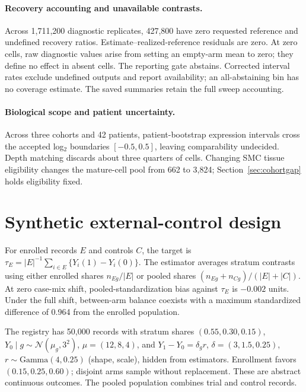 \paragraph{Recovery accounting and unavailable contrasts.}\label{app:generator}
Across 1{,}711{,}200 diagnostic replicates, 427{,}800 have zero requested
reference and undefined recovery ratios. Estimate--realized-reference
residuals are zero. At zero cells, raw diagnostic values arise from setting
an empty-arm mean to zero; they define no effect in absent cells. The
reporting gate abstains. Corrected interval rates exclude undefined outputs
and report availability; an all-abstaining bin has no coverage estimate.
The saved summaries retain the full sweep accounting.

\paragraph{Biological scope and patient uncertainty.}\label{app:guards}
\label{app:modal}\label{app:limitations}
Across three cohorts and 42 patients, patient-bootstrap expression intervals
cross the accepted log$_2$ boundaries $[-0.5,0.5]$, leaving comparability
undecided. Depth matching discards about three quarters of cells. Changing
SMC tissue eligibility changes the mature-cell pool from 662 to 3{,}824;
Section~\ref{sec:cohortgap} holds eligibility fixed.



\section{Synthetic external-control design}
\label{app:eca}

For enrolled records $E$ and controls $C$, the target is
$\tau_E=|E|^{-1}\sum_{i\in E}\{Y_i(1)-Y_i(0)\}$.
The estimator averages stratum contrasts using either enrolled shares
$n_{Eg}/|E|$ or pooled shares $(n_{Eg}+n_{Cg})/(|E|+|C|)$.
At zero case-mix shift, pooled-standardization bias against $\tau_E$ is
$-0.002$ units. Under the full shift, between-arm balance coexists with a
maximum standardized difference of 0.964 from the enrolled population.


The registry has 50{,}000 records with stratum shares $(0.55,0.30,0.15)$,
$Y_0\mid g\sim\mathcal N(\mu_g,3^2)$, $\mu=(12,8,4)$,
and $Y_1-Y_0=\delta_g r$, $\delta=(3,1.5,0.25)$,
$r\sim\mathrm{Gamma}(4,0.25)$ (shape, scale), hidden from estimators.
Enrollment favors $(0.15,0.25,0.60)$; disjoint arms sample without replacement.
These are abstract continuous outcomes. The pooled population combines
trial and control records.

